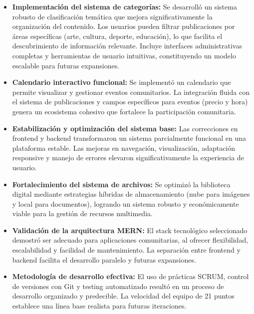 \begin{itemize}
    \item \textbf{Implementación del sistema de categorías:} Se desarrolló un sistema robusto de clasificación temática que mejora significativamente la organización del contenido. Los usuarios pueden filtrar publicaciones por áreas específicas (arte, cultura, deporte, educación), lo que facilita el descubrimiento de información relevante. Incluye interfaces administrativas completas y herramientas de usuario intuitivas, constituyendo un modelo escalable para futuras expansiones.
    
    \item \textbf{Calendario interactivo funcional:} Se implementó un calendario que permite visualizar y gestionar eventos comunitarios. La integración fluida con el sistema de publicaciones y campos específicos para eventos (precio y hora) genera un ecosistema cohesivo que fortalece la participación comunitaria.
    
    \item \textbf{Estabilización y optimización del sistema base:} Las correcciones en frontend y backend transformaron un sistema parcialmente funcional en una plataforma estable. Las mejoras en navegación, visualización, adaptación responsive y manejo de errores elevaron significativamente la experiencia de usuario.
    
    \item \textbf{Fortalecimiento del sistema de archivos:} Se optimizó la biblioteca digital mediante estrategias híbridas de almacenamiento (nube para imágenes y local para documentos), logrando un sistema robusto y económicamente viable para la gestión de recursos multimedia.
    
    \item \textbf{Validación de la arquitectura MERN:} El stack tecnológico seleccionado demostró ser adecuado para aplicaciones comunitarias, al ofrecer flexibilidad, escalabilidad y facilidad de mantenimiento. La separación entre frontend y backend facilita el desarrollo paralelo y futuras expansiones.
    
    \item \textbf{Metodología de desarrollo efectiva:} El uso de prácticas SCRUM, control de versiones con Git y testing automatizado resultó en un proceso de desarrollo organizado y predecible. La velocidad del equipo de 21 puntos establece una línea base realista para futuras iteraciones.
\end{itemize}

